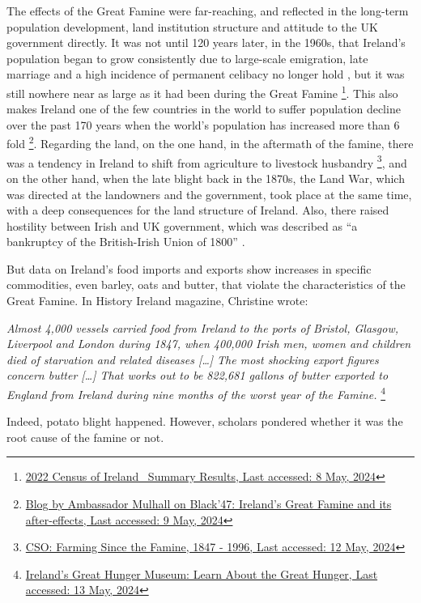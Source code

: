 The effects of the Great Famine were far-reaching, and reflected in the long-term population development, land institution structure and attitude to the UK government directly. It was not until 120 years later, in the 1960s, that Ireland's population began to grow consistently due to large-scale emigration, late marriage and a high incidence of permanent celibacy no longer hold \citep{grada1979population}, but it was still nowhere near as large as it had been during the Great Famine
\footnote{
	\href{https://www.cso.ie/en/releasesandpublications/ep/p-cpsr/censusofpopulation2022-summaryresults/populationchanges/}
	{2022 Census of Ireland \textendash\ Summary Results, Last accessed: 8 May, 2024}
}.
This also makes Ireland one of the few countries in the world to suffer population decline over the past 170 years when the world's population has increased more than 6 fold
\footnote{
	\href{https://www.dfa.ie/irish-embassy/usa/about-us/ambassador/ambassadors-blog/black47irelandsgreatfamineanditsafter-effects/}
	{Blog by Ambassador Mulhall on Black'47: Ireland's Great Famine and its after-effects, Last accessed: 9 May, 2024}
}. Regarding the land, on the one hand, in the aftermath of the famine, there was a tendency in Ireland to shift from agriculture to livestock husbandry
\footnote{
	\href{https://www.cso.ie/en/statistics/othercsopublications/farmingsincethefamine1847-1996/}{CSO: Farming Since the Famine, 1847 - 1996, Last accessed: 12 May, 2024}
}, and on the other hand, when the late blight back in the 1870s, the Land War, which was directed at the landowners and the government, took place at the same time, with a deep consequences for the land structure of Ireland. Also, there raised hostility between Irish and UK government, which was described as ``a bankruptcy of the British-Irish Union of 1800'' \citep{gray2021great}.

But data on Ireland's food imports and exports show increases in specific commodities, even barley, oats and butter, that violate the characteristics of the Great Famine. In History Ireland magazine, Christine wrote:

\textit{Almost 4,000 vessels carried food from Ireland to the ports of Bristol, Glasgow, Liverpool and London during 1847, when 400,000 Irish men, women and children died of starvation and related diseases [\ldots] The most shocking export figures concern butter [\ldots] That works out to be 822,681 gallons of butter exported to England from Ireland during nine months of the worst year of the Famine.}
\footnote{
	\href{https://www.ighm.org/learn.html}{Ireland's Great Hunger Museum: Learn About the Great Hunger, Last accessed: 13 May, 2024}
}

Indeed, potato blight happened. However, scholars pondered whether it was the root cause of the famine or not.

